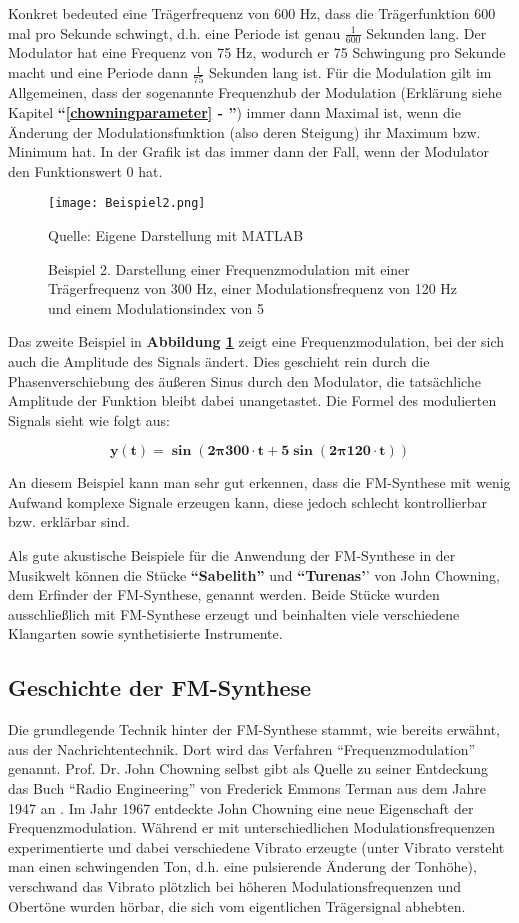 Konkret bedeuted eine Trägerfrequenz von 600 Hz, dass die Trägerfunktion 600 mal pro Sekunde schwingt, d.h. eine Periode ist genau $\frac{1}{600}$ Sekunden lang. Der Modulator hat eine Frequenz von 75 Hz, wodurch er 75 Schwingung pro Sekunde macht und eine Periode dann $\frac{1}{75}$ Sekunden lang ist. Für die Modulation gilt im Allgemeinen, dass der sogenannte Frequenzhub der Modulation (Erklärung siehe Kapitel \textbf{``\ref{chowningparameter} - ''}) immer dann Maximal ist, wenn die Änderung der Modulationsfunktion (also deren Steigung) ihr Maximum bzw. Minimum hat. In der Grafik ist das immer dann der Fall, wenn der Modulator den Funktionswert 0 hat.

\begin{figure} [ht]
\centering
  \texttt{[image: Beispiel2.png]}
\caption{Beispiel 2. Darstellung einer Frequenzmodulation mit einer Trägerfrequenz von 300 Hz, einer Modulationsfrequenz von 120 Hz und einem Modulationsindex von 5}
\label{fig:beispiel2}
Quelle: Eigene Darstellung mit MATLAB
\end{figure}

Das zweite Beispiel in \textbf{Abbildung \ref{fig:beispiel2}} zeigt eine Frequenzmodulation, bei der sich auch die Amplitude des Signals ändert. Dies geschieht rein durch die Phasenverschiebung des äußeren Sinus durch den Modulator, die tatsächliche Amplitude der Funktion bleibt dabei unangetastet. Die Formel des modulierten Signals sieht wie folgt aus:

\[
\bm{y(t) = \sin(2 \pmb{\pi} 300\cdot t + 5 \sin(2 \pmb{\pi} 120\cdot t))}
\]

An diesem Beispiel kann man sehr gut erkennen, dass die FM-Synthese mit wenig Aufwand komplexe Signale erzeugen kann, diese jedoch schlecht kontrollierbar bzw. erklärbar sind.

Als gute akustische Beispiele für die Anwendung der FM-Synthese in der Musikwelt können die Stücke \textbf{``Sabelith''} und \textbf{``Turenas'}' von John Chowning, dem Erfinder der FM-Synthese, genannt werden. Beide Stücke wurden ausschließlich mit FM-Synthese erzeugt und beinhalten viele verschiedene Klangarten sowie synthetisierte Instrumente.

\FloatBarrier
\subsection{Geschichte der FM-Synthese}
\label{geschichteFMSynthese}
Die grundlegende Technik hinter der FM-Synthese stammt, wie bereits erwähnt, aus der Nachrichtentechnik. Dort wird das Verfahren ``Frequenzmodulation'' genannt. Prof. Dr. John Chowning selbst gibt als Quelle zu seiner Entdeckung das Buch ``Radio Engineering'' von Frederick Emmons Terman aus dem Jahre 1947 an \cite[S. 35]{soundofinnovation}. Im Jahr 1967 entdeckte John Chowning eine neue Eigenschaft der Frequenzmodulation. Während er mit unterschiedlichen Modulationsfrequenzen experimentierte und dabei verschiedene Vibrato erzeugte (unter Vibrato versteht man einen schwingenden Ton, d.h. eine pulsierende Änderung der Tonhöhe), verschwand das Vibrato plötzlich bei höheren Modulationsfrequenzen und Obertöne wurden hörbar, die sich vom eigentlichen Trägersignal abhebten.\cite{fatherofdigitalmusik}

